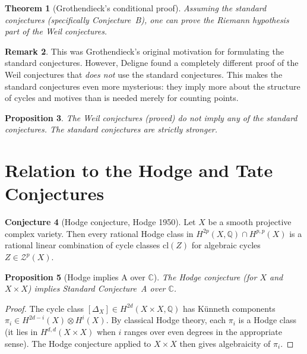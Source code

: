 \documentclass[12pt,a4paper]{amsart}
\newtheorem{theorem}{Theorem}[section]
\newtheorem{proposition}[theorem]{Proposition}
\theoremstyle{definition}
\newtheorem{remark}[theorem]{Remark}
\newtheorem{conjecture}[theorem]{Conjecture}
\newcommand{\Q}{\mathbb{Q}}
\newcommand{\C}{\mathbb{C}}
\newcommand{\cl}{\mathrm{cl}}
\begin{document}
\begin{theorem}[Grothendieck's conditional proof]
Assuming the standard conjectures (specifically Conjecture~B), one can prove
the Riemann hypothesis part of the Weil conjectures.
\end{theorem}

\begin{remark}
This was Grothendieck's original motivation for formulating the standard
conjectures.  However, Deligne found a completely different proof of the
Weil conjectures that \emph{does not} use the standard conjectures.  This
makes the standard conjectures even more mysterious: they imply more about
the structure of cycles and motives than is needed merely for counting points.
\end{remark}

\begin{proposition}
The Weil conjectures (proved) do \emph{not} imply any of the standard
conjectures.  The standard conjectures are strictly stronger.
\end{proposition}

\section{Relation to the Hodge and Tate Conjectures}\label{sec:hodge}

\begin{conjecture}[Hodge conjecture, Hodge 1950]
Let $X$ be a smooth projective complex variety.  Then every rational Hodge
class in $H^{2p}(X,\Q) \cap H^{p,p}(X)$ is a rational linear combination of
cycle classes $\cl(Z)$ for algebraic cycles $Z \in \mathcal{Z}^p(X)$.
\end{conjecture}

\begin{proposition}[Hodge implies A over $\mathbb{C}$]
The Hodge conjecture (for $X$ and $X \times X$) implies Standard Conjecture~A
over $\C$.
\end{proposition}

\begin{proof}
The cycle class $[\Delta_X] \in H^{2d}(X \times X, \Q)$ has K\"unneth
components $\pi_i \in H^{2d-i}(X) \otimes H^i(X)$.  By classical Hodge theory,
each $\pi_i$ is a Hodge class (it lies in $H^{d,d}(X \times X)$ when
$i$ ranges over even degrees in the appropriate sense).  The Hodge conjecture
applied to $X \times X$ then gives algebraicity of $\pi_i$.
\end{proof}
\end{document}
